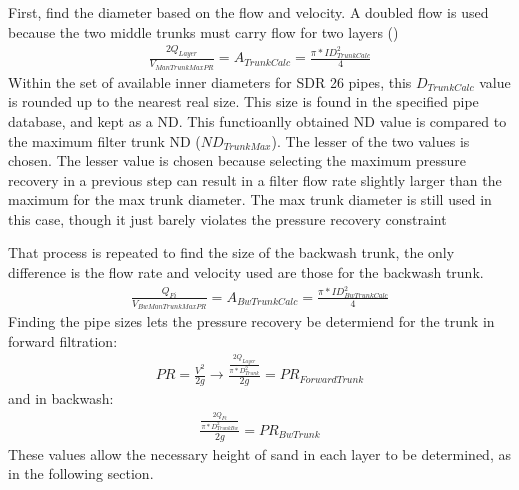 \documentclass[letterpaper,10pt,english]{sphinxmanual}
\begin{document}
First, find the diameter based on the flow and velocity. A doubled flow is used because the two middle trunks must carry flow for two layers ()
\begin{equation}\label{equation:Filtration/Filtration_Derivations:Filtration/Filtration_Derivations:13}
\begin{split}\frac{2Q_{Layer}}{V_{ManTrunkMaxPR}} = A_{TrunkCalc} = \frac{\pi*ID_{TrunkCalc}^2}{4}\end{split}
\end{equation}
Within the set of available inner diameters for SDR 26 pipes,  this \(D_{TrunkCalc}\) value is rounded up to the nearest real size. This size is found in the specified pipe database, and kept as a ND. This functioanlly obtained ND value is compared to the maximum filter trunk ND (\(ND_{TrunkMax}\)). The lesser of the two values is chosen. The lesser value is chosen because selecting the maximum pressure recovery in a previous step can result in a filter flow rate slightly larger than the maximum for the max trunk diameter. The max trunk diameter is still used in this case, though it just barely violates the pressure recovery constraint

That process is repeated to find the size of the backwash trunk, the only difference is the flow rate and velocity used are those for the backwash trunk.
\begin{equation}\label{equation:Filtration/Filtration_Derivations:Filtration/Filtration_Derivations:14}
\begin{split}\frac{Q_{Fi}}{V_{BwManTrunkMaxPR}} = A_{BwTrunkCalc} = \frac{\pi*ID_{BwTrunkCalc}^2}{4}\end{split}
\end{equation}
Finding the pipe sizes lets the pressure recovery be determiend for the trunk in forward filtration:
\begin{equation}\label{equation:Filtration/Filtration_Derivations:Filtration/Filtration_Derivations:15}
\begin{split}PR = \frac{V^2}{2g} \longrightarrow \frac{\frac{2Q_{Layer}}{\pi*D_{Trunk}^2}}{2g} = PR_{ForwardTrunk}\end{split}
\end{equation}
and in backwash:
\begin{equation}\label{equation:Filtration/Filtration_Derivations:Filtration/Filtration_Derivations:16}
\begin{split}\frac{\frac{2Q_{Fi}}{\pi*D_{TrunkBw}^2}}{2g} = PR_{BwTrunk}\end{split}
\end{equation}
These values allow the necessary height of sand in each layer to be determined, as in the following section.
\end{document}
